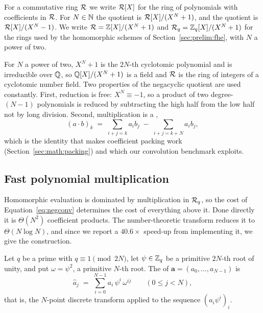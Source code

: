 \begin{definition}
\label{def:polyring}
For a commutative ring $\mathcal{R}$ we write $\mathcal{R}[X]$ for the ring of polynomials
with coefficients in $\mathcal{R}$. For $N \in \mathbb{N}$ the  quotient is
$\mathcal{R}[X]/(X^N+1)$, and the  quotient is $\mathcal{R}[X]/(X^N-1)$. We write
$\mathcal{R} = \mathbb{Z}[X]/(X^N+1)$ and $\mathcal{R}_q = \mathbb{Z}_q[X]/(X^N+1)$ for the rings used by the
homomorphic schemes of Section~\ref{sec:prelim:fhe}, with $N$ a power of two.
\end{definition}

For $N$ a power of two, $X^N+1$ is the $2N$-th cyclotomic polynomial and is
irreducible over $\mathbb{Q}$, so $\mathbb{Q}[X]/(X^N+1)$ is a field and $\mathcal{R}$ is the ring of
integers of a cyclotomic number field. Two properties of the negacyclic quotient
are used constantly. First, reduction is free: $X^N \equiv -1$, so a product of
two degree-$(N-1)$ polynomials is reduced by subtracting the high half from the
low half not by long division. Second, multiplication is a ,
\begin{equation}
\label{eq:negconv}
  (a \cdot b)_k \;=\; \sum_{i+j=k} a_i b_j \;-\; \sum_{i+j=k+N} a_i b_j ,
\end{equation}
which is the identity that makes coefficient packing work
(Section~\ref{sec:math:packing}) and which our convolution benchmark exploits.

\subsection{Fast polynomial multiplication}
\label{sec:math:ntt}

Homomorphic evaluation is dominated by multiplication in $\mathcal{R}_q$, so the cost of
Equation~\eqref{eq:negconv} determines the cost of everything above it. Done
directly it is $\Theta(N^2)$ coefficient products. The number-theoretic transform
reduces it to $\Theta(N \log N)$, and since we report a $40.6\times$ speed-up
from implementing it, we give the construction.

\begin{definition}
\label{def:ntt}
Let $q$ be a prime with $q \equiv 1 \pmod{2N}$, let $\psi \in \mathbb{Z}_q$ be a
primitive $2N$-th root of unity, and put $\omega = \psi^2$, a primitive $N$-th
root. The  of
$\mathbf{a} = (a_0,\dots,a_{N-1})$ is
\[
  \widehat{a}_j \;=\; \sum_{i=0}^{N-1} a_i\, \psi^{i}\, \omega^{ij}
  \qquad (0 \le j < N),
\]
that is, the $N$-point discrete transform applied to the sequence
$(a_i \psi^i)_i$.
\end{definition}

